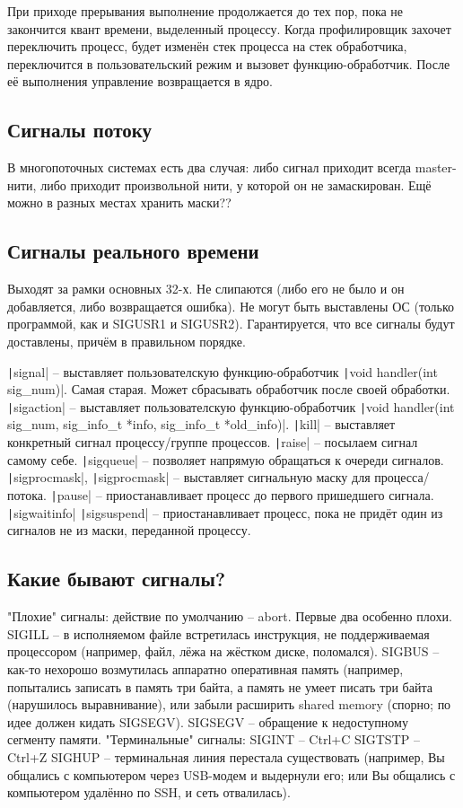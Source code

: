 \documentclass[a4paper,10pt]{article}
\newcommand{\ci}{\texttt}
\begin{document}
При приходе прерывания выполнение продолжается до тех пор, пока не закончится квант времени, выделенный процессу. 
Когда профилировщик захочет переключить процесс, будет изменён стек процесса на стек обработчика, переключится в пользовательский режим и вызовет функцию-обработчик. После её выполнения управление возвращается в ядро.

\subsection{Сигналы потоку}
В многопоточных системах есть два случая: либо сигнал приходит всегда master-нити, либо приходит произвольной нити, у которой он не замаскирован.
Ещё можно в разных местах хранить маски??

\subsection{Сигналы реального времени}
Выходят за рамки основных 32-х. Не слипаются (либо его не было и он добавляется, либо возвращается ошибка). Не могут быть выставлены ОС (только программой, как и SIGUSR1 и SIGUSR2).
Гарантируется, что все сигналы будут доставлены, причём в правильном порядке.

\ci|signal| -- выставляет пользователскую функцию-обработчик  \ci|void handler(int sig_num)|. Самая старая. Может сбрасывать обработчик после своей обработки.
\ci|sigaction| -- выставляет пользователскую функцию-обработчик  \ci|void handler(int sig_num, sig_info_t *info, sig_info_t *old_info)|.
\ci|kill| -- выставляет конкретный сигнал процессу/группе процессов.
\ci|raise| -- посылаем сигнал самому себе.
\ci|sigqueue| -- позволяет напрямую обращаться к очереди сигналов.
\ci|sigprocmask|, \ci|sigprocmask| -- выставляет сигнальную маску для процесса/потока.
\ci|pause| -- приостанавливает процесс до первого пришедшего сигнала.
\ci|sigwaitinfo|
\ci|sigsuspend| -- приостанавливает процесс, пока не придёт один из сигналов не из маски, переданной процессу.

\subsection{Какие бывают сигналы?}
"Плохие" сигналы: действие по умолчанию -- abort. Первые два особенно плохи.
SIGILL -- в исполняемом файле встретилась инструкция, не поддерживаемая процессором (например, файл, лёжа на жёстком диске, поломался).
SIGBUS -- как-то нехорошо возмутилась аппаратно оперативная память (например, попытались записать в память три байта, а память не умеет писать три байта (нарушилось выравнивание), или забыли расширить shared memory (спорно; по идее должен кидать SIGSEGV).
SIGSEGV -- обращение к недоступному сегменту памяти.
"Терминальные" сигналы:
SIGINT -- Ctrl+C
SIGTSTP -- Ctrl+Z
SIGHUP -- терминальная линия перестала существовать (например, Вы общались с компьютером через USB-модем и выдернули его; или Вы общались с компьютером удалённо по SSH, и сеть отвалилась).
\end{document}
